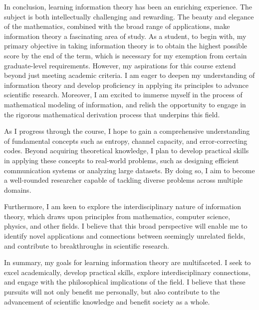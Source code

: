 \documentclass[a4paper,conference]{IEEEtran}
\begin{document}
In conclusion, learning information theory has been an enriching experience. The subject is both intellectually challenging and rewarding. The beauty and elegance of the mathematics, combined with the broad range of applications, make information theory a fascinating area of study. 
As a student, to begin with, my primary objective in taking information theory is to obtain the highest possible score by the end of the term, which is necessary for my exemption from certain graduate-level requirements. However, my aspirations for this course extend beyond just meeting academic criteria. I am eager to deepen my understanding of information theory and develop proficiency in applying its principles to advance scientific research. Moreover, I am excited to immerse myself in the process of mathematical modeling of information, and relish the opportunity to engage in the rigorous mathematical derivation process that underpins this field.

As I progress through the course, I hope to gain a comprehensive understanding of fundamental concepts such as entropy, channel capacity, and error-correcting codes. Beyond acquiring theoretical knowledge, I plan to develop practical skills in applying these concepts to real-world problems, such as designing efficient communication systems or analyzing large datasets. By doing so, I aim to become a well-rounded researcher capable of tackling diverse problems across multiple domains.

Furthermore, I am keen to explore the interdisciplinary nature of information theory, which draws upon principles from mathematics, computer science, physics, and other fields. I believe that this broad perspective will enable me to identify novel applications and connections between seemingly unrelated fields, and contribute to breakthroughs in scientific research.

In summary, my goals for learning information theory are multifaceted. I seek to excel academically, develop practical skills, explore interdisciplinary connections, and engage with the philosophical implications of the field. I believe that these pursuits will not only benefit me personally, but also contribute to the advancement of scientific knowledge and benefit society as a whole.
\end{document}
